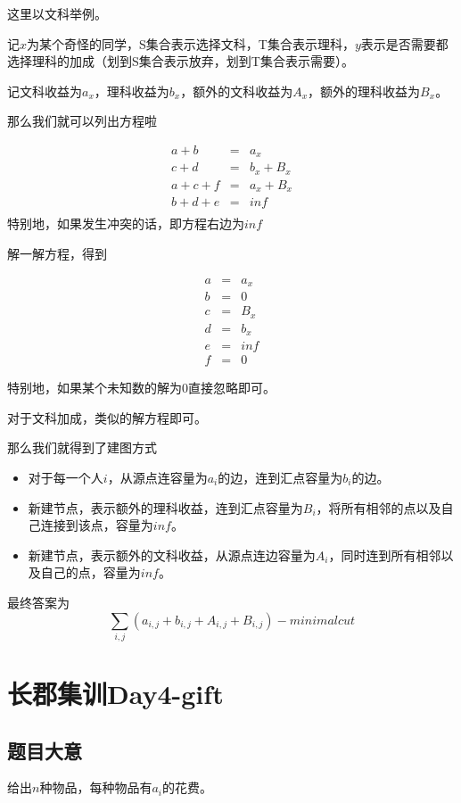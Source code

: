 \documentclass{ctexart}
\numberwithin{equation}{section}
\begin{document}
\begin{flushleft}
  这里以文科举例。

  记$x$为某个奇\;\male \;怪的同学，S集合表示选择文科，T集合表示理科，$y$表示是否需要都选择理科的加成（划到S集合表示放弃，划到T集合表示需要）。

  记文科收益为$a_x$，理科收益为$b_x$，额外的文科收益为$A_x$，额外的理科收益为$B_x$。
  
  那么我们就可以列出方程啦

  \begin{eqnarray*} 
    a + b &=&  a_x \\
    c + d &=&  b_x+B_x\\
    a + c + f &=& a_x+B_x\\
    b + d + e &=& inf\\
  \end{eqnarray*}
  特别地，如果发生冲突的话，即方程右边为$inf$

  解一解方程，得到
  
  \begin{eqnarray*} 
    a &=& a_x\\
    b &=& 0\\
    c &=& B_x\\
    d &=& b_x\\
    e &=& inf\\
    f &=& 0
  \end{eqnarray*}

  特别地，如果某个未知数的解为$0$直接忽略即可。
  
  对于文科加成，类似的解方程即可。

  那么我们就得到了建图方式

  \begin{itemize}
  \item 对于每一个人$i$，从源点连容量为$a_i$的边，连到汇点容量为$b_i$的边。
  \item 新建节点，表示额外的理科收益，连到汇点容量为$B_i$，将所有相邻的点以及自己连接到该点，容量为$inf$。
  \item 新建节点，表示额外的文科收益，从源点连边容量为$A_i$，同时连到所有相邻以及自己的点，容量为$inf$。
  \end{itemize}

  最终答案为$$\sum_{i,j}(a_{i,j}+b_{i,j}+A_{i,j}+B_{i,j})-minimalcut$$
  \newpage

  \section{长郡集训Day4-gift}
  \subsection{题目大意}
  给出$n$种物品，每种物品有$a_i$的花费。


\end{flushleft}
\end{document}
